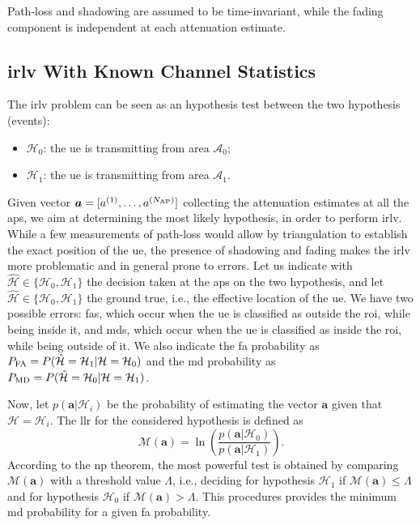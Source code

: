 \documentclass[draftcls,onecolumn,12pt]{IEEEtran}
\begin{document}
Path-loss and shadowing are assumed to be time-invariant, while the fading component is independent at each attenuation estimate. 

\subsection{\ac{irlv} With Known Channel Statistics}\label{sec:auth}

The \ac{irlv} problem can be seen as an hypothesis test between the two hypothesis (events):
\begin{itemize}
    \item $\mathcal{H}_0$: the \ac{ue} is transmitting from area $\mathcal{A}_0$;
    \item $\mathcal{H}_1$: the \ac{ue} is transmitting from area $\mathcal{A}_1$.
\end{itemize}
Given vector $\bm{a} = [a^{(1)}, \ldots, a^{(N_{\rm AP})}]$ collecting the attenuation estimates at all the \acp{ap}, we aim  at determining the most likely hypothesis, in order to perform  \ac{irlv}. While a few measurements of path-loss would allow by triangulation to establish the exact position of the \ac{ue}, the presence of shadowing and fading makes the \ac{irlv} more problematic and in general prone to errors. Let us indicate with $\hat{\mathcal H} \in  \{\mathcal{H}_0, \mathcal{H}_1\}$ the decision taken at the \acp{ap} on the two hypothesis, and let $\hat{\mathcal H} \in  \{\mathcal{H}_0, \mathcal{H}_1\}$ the ground true, i.e., the effective location of the \ac{ue}. We have two possible errors: \acp{fa}, which occur when the \ac{ue}  is classified as outside the \ac{roi}, while being inside it, and \acp{md}, which occur when the \ac{ue}  is classified as inside the \ac{roi}, while being outside of it. We also indicate the \ac{fa} probability  as $P_{\rm FA} =P(\hat{\mathcal H} = \mathcal H_1 | \mathcal H = \mathcal H_0)$ and the \ac{md} probability as $P_{\rm MD}=P(\hat{\mathcal H} = \mathcal H_0 | \mathcal H = \mathcal H_1)$.

Now, let  $p(\bm{a}|\mathcal{H}_i)$ be the probability of estimating the vector $\bm{a}$ given that  $\mathcal{H} = \mathcal{H}_i$. The \ac{llr} for the considered hypothesis is defined as 
\begin{equation}\label{eq:lr}
    {\mathcal M}(\bm{a})=\ln\left(\frac{p(\bm{a}|\mathcal{H}_0)}{p(\bm{a}|\mathcal{H}_1)}\right).
\end{equation}
According to the \ac{np} theorem, the most powerful test is obtained by comparing $\mathcal{M}(\bm{a})$ with a threshold value $\Lambda$, i.e., deciding for hypothesis $\mathcal{H}_1$ if $\mathcal{M}(\bm{a}) \le \Lambda$ and for hypothesis $\mathcal{H}_0$ if $\mathcal{M}(\bm{a}) > \Lambda$. This procedures  provides the minimum \ac{md} probability for a given  \ac{fa} probability.
\end{document}
